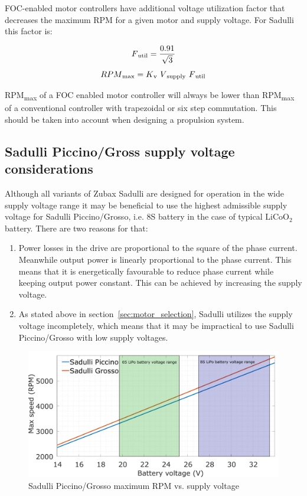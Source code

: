 FOC-enabled motor controllers have additional voltage utilization factor that decreases the maximum RPM 
for a given motor and supply voltage. For Sadulli this factor is:

\[F\textsubscript{util} = \frac{0.91}{\sqrt{3}}\]
\[RPM\textsubscript{max} = K\textsubscript{v}\ V\textsubscript{supply}\ F\textsubscript{util}\]

RPM\textsubscript{max} of a FOC enabled motor controller will always be lower than RPM\textsubscript{max} 
of a conventional controller with trapezoidal or six step commutation. This should be taken into account 
when designing a propulsion system. 

\newpage

\subsection {Sadulli Piccino/Gross supply voltage considerations}

Although all variants of Zubax Sadulli are designed for operation in the wide supply voltage range it may be beneficial to use the highest admissible supply voltage for Sadulli Piccino/Grosso, i.e. 8S battery in the case of typical $\text{LiCoO}_\text{2}$ battery. There are two reasons for that:

\begin{enumerate}
\item Power losses in the drive are proportional to the square of the phase current. Meanwhile output power is linearly proportional to the phase current. This means that it is energetically favourable to reduce phase current while keeping output power constant. This can be achieved by increasing the supply voltage. 

\item As stated above in section~\ref{sec:motor_selection}, Sadulli utilizes the supply voltage incompletely, which means that it may be impractical to use Sadulli Piccino/Grosso with low supply voltages.
\end{enumerate}

\begin{figure}[!hbt]
    \centerline{\includegraphics[width=1\textwidth]{figures/thrust_graphs/maxrpm_vs_voltage.pdf}}
    \caption{Sadulli Piccino/Grosso maximum RPM vs. supply voltage}
\end{figure}

